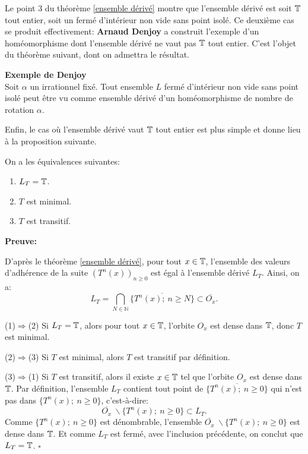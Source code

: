 	Le point 3 du théorème \ref{ensemble dérivé} montre que l'ensemble dérivé est soit ${\mathbb{T}}$ tout entier, soit un fermé d'intérieur non vide sans point isolé. Ce deuxième cas se produit effectivement: \textbf{Arnaud Denjoy} a construit l'exemple d'un homéomorphisme dont l'ensemble dérivé ne vaut pas ${\mathbb{T}}$ tout entier. C'est l'objet du théorème suivant, dont on admettra le résultat.

\begin{theorem}\label{Denjoy}
	\textbf{Exemple de Denjoy}\\
	Soit $\alpha$ un irrationnel fixé. Tout ensemble $L$ fermé d'intérieur non vide sans point isolé peut être vu comme ensemble dérivé d'un homéomorphisme de nombre de rotation $\alpha$.
\end{theorem}



Enfin, le cas où l'ensemble dérivé vaut ${\mathbb{T}}$ tout entier est plus simple et donne lieu à la proposition suivante.

\begin{proposition}
 	On a les équivalences suivantes:
 	\begin{enumerate}
		\item $L_T= {\mathbb{T}}$.
		\item $T$ est minimal.
		\item $T$ est transitif.
 	\end{enumerate}
\end{proposition}

	\textbf{Preuve:}
	\par D'après le théorème \ref{ensemble dérivé}, pour tout $x \in {\mathbb{T}}$, l'ensemble des valeurs d'adhérence de la suite $(T^n(x))_{n\geq 0}$ est égal à l'ensemble dérivé $L_T$.
	 Ainsi, on a:
	$$L_T= \underset{N \in \mathbb{N}}{\bigcap}\overline{\lbrace T^n(x); \ n\geq N\rbrace}\subset \overline{O_x} .$$

	\par(1)$\Rightarrow$(2) Si $L_T = {\mathbb{T}}$, alors pour tout $x \in {\mathbb{T}}$, l'orbite $O_x$ est dense dans ${\mathbb{T}}$, donc $T$ est minimal.\\

	\par(2)$\Rightarrow$(3) Si $T$ est minimal, alors $T$ est transitif par définition.\\

	\par(3)$\Rightarrow$(1) Si $T$ est transitif, alors il existe $x \in {\mathbb{T}}$ tel que l'orbite $O_x$ est dense dans ${\mathbb{T}}$. Par définition, l'ensemble $L_T$ contient tout point de $\overline{\lbrace T^n(x);\ n \geq 0\rbrace}$ qui n'est pas dans $\lbrace T^n(x);\ n \geq 0\rbrace$, c'est-à-dire:
		$$\overline{O_x}\ \backslash \lbrace T^n(x);\ n \geq 0\rbrace \subset L_T.$$
	Comme $\lbrace T^n(x);\ n \geq 0\rbrace$ est dénombrable, l'ensemble $\overline{O_x}\ \backslash \lbrace T^n(x);\ n \geq 0\rbrace$ est dense dans ${\mathbb{T}}$. Et comme $L_T$ est fermé, avec l'inclusion précédente, on conclut que $L_T= {\mathbb{T}}$. \hfill $\square$\\



